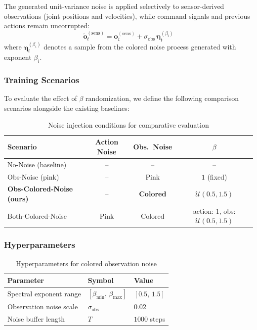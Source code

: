 The generated unit-variance noise is applied selectively to sensor-derived observations
(joint positions and velocities), while command signals and previous actions remain uncorrupted:
\begin{equation}
  \tilde{\boldsymbol{o}}_t^{(\mathrm{sens})} = \boldsymbol{o}_t^{(\mathrm{sens})} + \sigma_{\mathrm{obs}} \, \boldsymbol{\eta}_t^{(\beta_i)}
  \label{eq:corruption}
\end{equation}
where $\boldsymbol{\eta}_t^{(\beta_i)}$ denotes a sample from the colored noise process
generated with exponent $\beta_i$.

\subsubsection{Training Scenarios}

To evaluate the effect of $\beta$ randomization, we define the following comparison scenarios
alongside the existing baselines:

\begin{table}[htbp]
  \centering
  \caption{Noise injection conditions for comparative evaluation}
  \label{tab:colored_scenarios}
  \begin{tabular}{lccc}
    \toprule
    Scenario & Action Noise & Obs.\ Noise & $\beta$ \\
    \midrule
    No-Noise (baseline) & -- & -- & -- \\
    Obs-Noise (pink) & -- & Pink & $1$ (fixed) \\
    \textbf{Obs-Colored-Noise (ours)} & -- & \textbf{Colored} & $\boldsymbol{\mathcal{U}(0.5, 1.5)}$ \\
    Both-Colored-Noise & Pink & Colored & action: $1$, obs: $\mathcal{U}(0.5, 1.5)$ \\
    \bottomrule
  \end{tabular}
\end{table}

\subsubsection{Hyperparameters}

\begin{table}[htbp]
  \centering
  \caption{Hyperparameters for colored observation noise}
  \label{tab:colored_hyperparams}
  \begin{tabular}{lll}
    \toprule
    Parameter & Symbol & Value \\
    \midrule
    Spectral exponent range & $[\beta_{\min},\, \beta_{\max}]$ & $[0.5,\, 1.5]$ \\
    Observation noise scale & $\sigma_{\mathrm{obs}}$ & $0.02$ \\
    Noise buffer length & $T$ & $1000$ steps \\
    \bottomrule
  \end{tabular}
\end{table}

